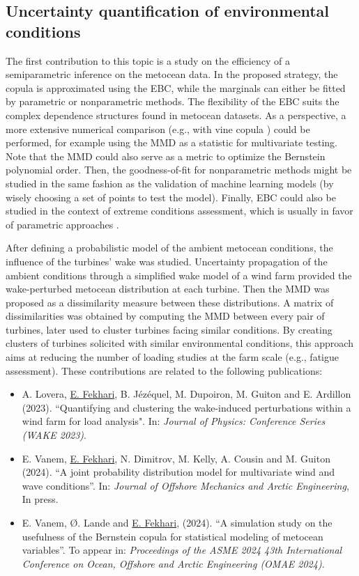 \subsection*{Uncertainty quantification of environmental conditions}
The first contribution to this topic is a study on the efficiency of a semiparametric inference on the metocean data. 
In the proposed strategy, the copula is approximated using the EBC, while the marginals can either be fitted by parametric or nonparametric methods.   
The flexibility of the EBC suits the complex dependence structures found in metocean datasets. 
As a perspective, a more extensive numerical comparison (e.g., with vine copula \citealp{vanem_2016,lin_2019_cvines_waves}) could be performed, for example using the MMD as a statistic for multivariate testing. 
Note that the MMD could also serve as a metric to optimize the Bernstein polynomial order. 
Then, the goodness-of-fit for nonparametric methods might be studied in the same fashion as the validation of machine learning models (by wisely choosing a set of points to test the model).
Finally, EBC could also be studied in the context of extreme conditions assessment, which is usually in favor of parametric approaches \citep{vanem_fekhari_2024}. 

After defining a probabilistic model of the ambient metocean conditions, the influence of the turbines' wake was studied. 
Uncertainty propagation of the ambient conditions through a simplified wake model of a wind farm provided the wake-perturbed metocean distribution at each turbine.  
Then the MMD was proposed as a dissimilarity measure between these distributions. 
A matrix of dissimilarities was obtained by computing the MMD between every pair of turbines, later used to cluster turbines facing similar conditions.  
By creating clusters of turbines solicited with similar environmental conditions, this approach aims at reducing the number of loading studies at the farm scale (e.g., fatigue assessment).
These contributions are related to the following publications:
\begin{itemize}
    \footnotesize
    \item[\ding{125}] A. Lovera, \underline{E. Fekhari}, B. Jézéquel, M. Dupoiron, M. Guiton and E. Ardillon (2023). ``Quantifying and clustering the wake-induced perturbations within a wind farm for load analysis". In: \textit{Journal of Physics: Conference Series (WAKE 2023)}.
    \item[\ding{125}] E. Vanem, \underline{E. Fekhari}, N. Dimitrov, M. Kelly, A. Cousin and M. Guiton (2024). ``A joint probability distribution model for multivariate wind and wave conditions''. In: \textit{Journal of Offshore Mechanics and Arctic Engineering}, In press. 
    \item[\ding{125}] E. Vanem, \O{}. Lande and \underline{E. Fekhari}, (2024). ``A simulation study on the usefulness of the Bernstein copula for statistical modeling of metocean variables''. To appear in: \textit{Proceedings of the ASME 2024 43th International Conference on Ocean, Offshore and Arctic Engineering (OMAE 2024)}.
\end{itemize}

